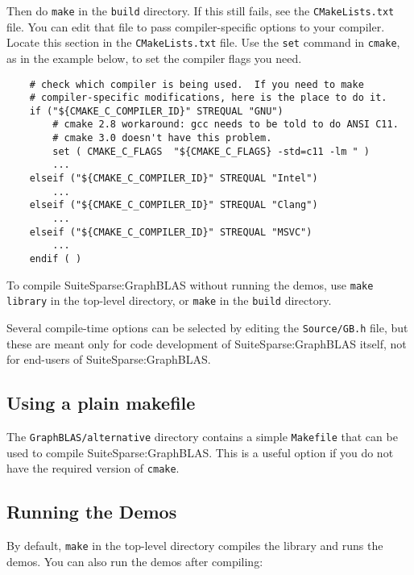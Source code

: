 \documentclass[12pt]{article}
\begin{document}
\noindent
Then do \verb'make' in the \verb'build' directory.  If this still fails, see
the \verb'CMakeLists.txt' file.  You can edit that file to pass
compiler-specific options to your compiler.  Locate this section in the
\verb'CMakeLists.txt' file.  Use the \verb'set' command in \verb'cmake', as in
the example below, to set the compiler flags you need.

    {\small
    \begin{verbatim}
    # check which compiler is being used.  If you need to make
    # compiler-specific modifications, here is the place to do it.
    if ("${CMAKE_C_COMPILER_ID}" STREQUAL "GNU")
        # cmake 2.8 workaround: gcc needs to be told to do ANSI C11.
        # cmake 3.0 doesn't have this problem.
        set ( CMAKE_C_FLAGS  "${CMAKE_C_FLAGS} -std=c11 -lm " )
        ...
    elseif ("${CMAKE_C_COMPILER_ID}" STREQUAL "Intel")
        ...
    elseif ("${CMAKE_C_COMPILER_ID}" STREQUAL "Clang")
        ...
    elseif ("${CMAKE_C_COMPILER_ID}" STREQUAL "MSVC")
        ...
    endif ( )
    \end{verbatim} }

To compile SuiteSparse:GraphBLAS without running the demos, use
\verb'make library' in the top-level directory, or \verb'make' in the
\verb'build' directory.

Several compile-time options can be selected by editing the \verb'Source/GB.h'
file, but these are meant only for code development of SuiteSparse:GraphBLAS
itself, not for end-users of SuiteSparse:GraphBLAS.

\subsection{Using a plain makefile}

The \verb'GraphBLAS/alternative' directory contains a simple \verb'Makefile'
that can be used to compile SuiteSparse:GraphBLAS.  This is a useful option
if you do not have the required version of \verb'cmake'.

\subsection{Running the Demos}

By default, \verb'make' in the top-level directory compiles the library
and runs the demos.  You can also run the demos after compiling:
\end{document}
